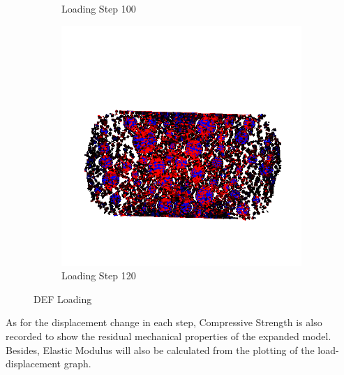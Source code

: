\begin{figure}[ht]
\begin{subfigure}{.33\textwidth}
      \caption{Loading Step 100}
      \end{subfigure}%
      \begin{subfigure}{.33\textwidth}
        \centering
        \includegraphics[width=1.0\linewidth]{Files/A30X-5C_3_IS/DEP50-STEP(120).png}
        \caption{Loading Step 120}
      \end{subfigure}

  \caption{DEF Loading}
  \label{fig:DEF_Loading}
\end{figure}


As for the displacement change in each step, Compressive Strength is also recorded to show the residual mechanical properties of the expanded model. Besides, Elastic Modulus will also be calculated from the plotting of the load-displacement graph.












